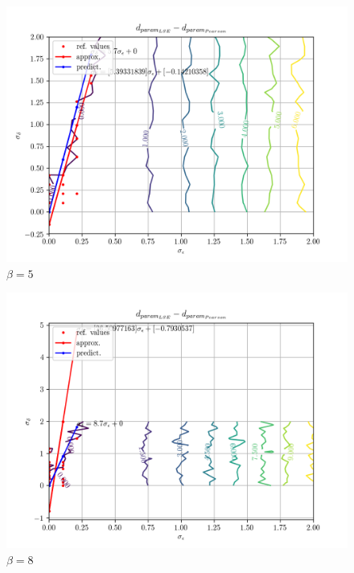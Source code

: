 \documentclass[a4paper,landscape,hidelinks,14pt]{extarticle}
\begin{document}
\begin{figure}[h!]
  \centering
  \includegraphics[width=.8\linewidth]{fig/beta-5_param-accs-diff-approx.png}
  \caption{$ \beta = 5 $}
\end{figure}

\begin{figure}[h!]
  \centering
  \includegraphics[width=.8\linewidth]{fig/beta-8_param-accs-diff-approx.png}
  \caption{$ \beta = 8 $}
\end{figure}
\end{document}
